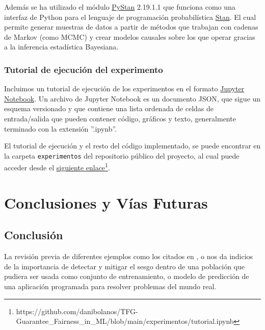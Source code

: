 \documentclass[oneside,openright,titlepage,numbers=noenddot,openany,headinclude,footinclude=true,
cleardoublepage=empty,abstractoff,BCOR=5mm,paper=a4,fontsize=12pt,main=spanish]{scrreprt}
\begin{document}
Además se ha utilizado el módulo \href{https://pystan.readthedocs.io/en/latest}{PyStan} 2.19.1.1 que funciona como una interfaz de Python para el lenguaje de programación probabilística \href{https://mc-stan.org}{Stan}. El cual permite generar muestras de datos a partir de métodos que trabajan con cadenas de Markov (como MCMC) y crear modelos causales sobre los que operar gracias a la inferencia estadística Bayesiana.

\section{Tutorial de ejecución del experimento} \label{sec:manual}

Incluimos un tutorial de ejecución de los experimentos en el formato \href{https://jupyter.org/documentation}{Jupyter Notebook}. Un archivo de Jupyter Notebook es un documento JSON, que sigue un esquema versionado y que contiene una lista ordenada de celdas de entrada/salida que pueden contener código, gráficos y texto, generalmente terminado con la extensión ''.ipynb''. 

El tutorial de ejecución y el resto del código implementado, se puede encontrar en la carpeta \texttt{experimentos} del repositorio público del proyecto, al cual puede acceder desde el \href{https://github.com/danibolanos/TFG-Guarantee_Fairness_in_ML/blob/main/experimentos/tutorial.ipynb}{siguiente enlace}\footnote{https://github.com/danibolanos/TFG-Guarantee\_Fairness\_in\_ML/blob/main/experimentos/tutorial.ipynb}.

\part{Conclusiones y Vías Futuras} \label{part:debate_fut}

\chapter{Conclusión} \label{ch:conclusion}

La revisión previa de diferentes ejemplos como los citados en \cite{prestamo2018}, \cite{contratar2015} o \cite{condena2016} nos da indicios de la importancia de detectar y mitigar el sesgo dentro de una población que pudiera ser usada como conjunto de entrenamiento, o modelo de predicción de una aplicación programada para resolver problemas del mundo real. 
\end{document}
